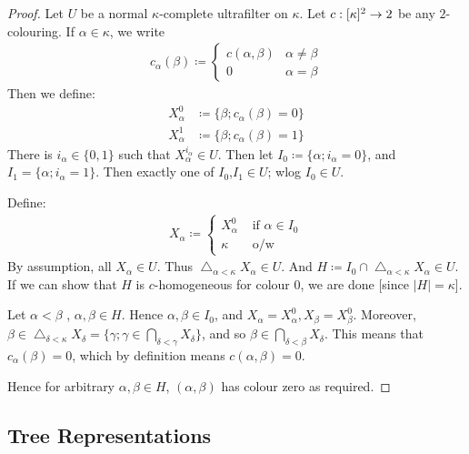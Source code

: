 \documentclass[]{article}
\newcommand{\tri}{\mathop{\triangle}}
\begin{document}
\begin{proof}
    Let $U$ be a normal $\kappa$-complete ultrafilter on $\kappa$. Let $c : [\kappa]^2 \rightarrow 2$ be any $2$-colouring. If $\alpha \in \kappa$, we write
    \begin{align*}
        c_\alpha(\beta) \coloneqq \left\lbrace \begin{array}{cl}c(\alpha,\beta) & \alpha \ne \beta\\ 0 & \alpha = \beta \end{array}\right.
    \end{align*}
    Then we define:
    \begin{align*}
        X^0_\alpha &\coloneqq \{\beta ; c_\alpha(\beta) = 0\}\\
        X^1_\alpha &\coloneqq \{\beta ; c_\alpha(\beta) = 1\}
    \end{align*}
    There is $i_\alpha \in \{0,1\}$ such that $X^{i_\alpha}_\alpha \in U$. Then let $I_0 \coloneqq \{\alpha; i_\alpha = 0\}$, and $I_1 = \{\alpha; i_\alpha = 1\}$. Then exactly one of $I_0$,$I_1 \in U$; wlog $I_0 \in U$.

    Define:
    \begin{align*}
        X_\alpha \coloneqq \left\lbrace \begin{array}{cl}X^0_\alpha & \textrm{ if }\alpha \in I_0 \\ \kappa & \textrm{ o/w} \end{array}\right.
    \end{align*}
    By assumption, all $X_\alpha \in U$. Thus $\tri_{\alpha < \kappa}X_\alpha \in U$. And $H\coloneqq I_0 \cap \tri_{\alpha < \kappa}X_\alpha \in U$. If we can show that $H$ is $c$-homogeneous for colour $0$, we are done [since $|H| = \kappa$].

    Let $\alpha < \beta$ , $\alpha,\beta \in H$. Hence $\alpha,\beta \in I_0$, and $X_\alpha = X^0_\alpha,X_\beta = X^0_\beta$. Moreover, $\beta \in \tri_{\delta < \kappa}X_\delta = \{\gamma;\gamma \in \bigcap_{\delta < \gamma}X_\delta\}$, and so $\beta \in \bigcap_{\delta < \beta}X_\delta$. This means that $c_\alpha(\beta) = 0$, which by definition means $c(\alpha,\beta) = 0$.

    Hence for arbitrary $\alpha,\beta\in H$, $(\alpha,\beta)$ has colour zero as required.
\end{proof}

\subsection*{Tree Representations}
\end{document}
